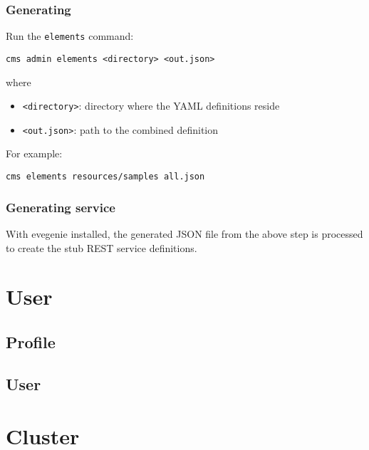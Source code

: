 \documentclass[9pt,twocolumn,twoside]{styles/osajnl}
\begin{document}
\subsubsection{Generating}

Run the \verb+elements+ command:

\begin{verbatim}
cms admin elements <directory> <out.json>
\end{verbatim}

where

\begin{itemize}
\item \verb+<directory>+: directory where the YAML definitions reside
\item \verb+<out.json>+: path to the combined definition
\end{itemize}


For example:

\begin{verbatim}
cms elements resources/samples all.json
\end{verbatim}


\subsubsection{Generating service}

With evegenie installed, the generated JSON file from the above step
is processed to create the stub REST service definitions.




\section{User}

\subsection{Profile}



\subsection{User}



\section{Cluster}
\end{document}
